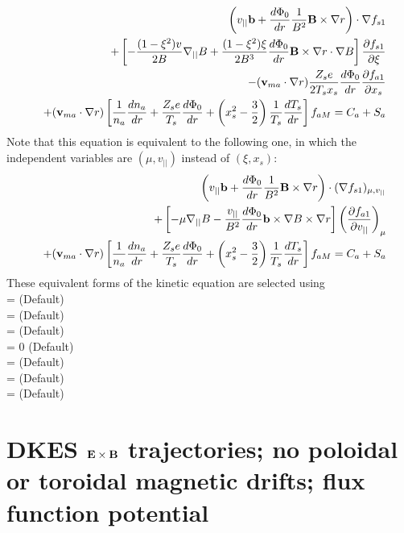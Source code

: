 \begin{eqnarray}
&&\left(v_{||}{\mathbf b} + \frac{d\Phi_0}{dr} \frac{1}{B^2} {\mathbf B}\times\nabla r \right) \cdot \nabla f_{s1} \\
&&+ \left[ - \frac{(1-\xi^2)v}{2B} \nabla_{||} B
+\frac{(1-\xi^2)\xi}{2B^3} \frac{d\Phi_0}{dr}{\mathbf B}\times\nabla r\cdot\nabla B \right]
 \frac{\partial f_{s1}}{\partial \xi} \nonumber \\
&&-({\mathbf v}_{ma} \cdot\nabla r) \frac{Z_s e}{2 T_s x_s} \frac{d\Phi_0}{dr} \frac{\partial f_{a1}}{\partial x_s} \nonumber \\
&&+ ({\mathbf v}_{ma} \cdot \nabla r) \left[ \frac{1}{n_a} \frac{dn_a}{dr} + \frac{Z_s e}{T_s} \frac{d\Phi_0}{dr} + \left(x_s^2-\frac{3}{2}\right) \frac{1}{T_s} \frac{dT_s}{dr}\right] f_{aM}
 = C_a + S_a \nonumber
\end{eqnarray}
Note that this equation is equivalent to the following one, in which the independent variables
are $(\mu,v_{||})$ instead of $(\xi,x_s)$:
\begin{eqnarray}
&&\left(v_{||}{\mathbf b} + \frac{d\Phi_0}{dr} \frac{1}{B^2} {\mathbf B}\times\nabla r \right) \cdot (\nabla f_{s1})_{\mu, v_{||}} \\
&&+ \left[ - \mu \nabla_{||} B
-\frac{v_{||}}{B^2} \frac{d\Phi_0}{dr} {\mathbf b}\times\nabla B \times \nabla r \right]
\left( \frac{\partial f_{a1}}{\partial v_{||}} \right)_{\mu} \nonumber \\
&& + ({\mathbf v}_{ma} \cdot \nabla r) \left[ \frac{1}{n_a} \frac{dn_a}{dr} + \frac{Z_s e}{T_s} \frac{d\Phi_0}{dr} + \left(x_s^2-\frac{3}{2}\right) \frac{1}{T_s} \frac{dT_s}{dr}\right] f_{aM}
=C_a + S_a \nonumber
\end{eqnarray}
These equivalent forms of the kinetic equation are selected using \\
 = \true  \;\;\; (Default) \\
 = \true \;\;\; (Default) \\
 = \false \;\;\; (Default) \\
 = 0 \;\;\; (Default) \\
 = \false \;\;\; (Default) \\
 = \false \;\;\; (Default) \\
 = \false \;\;\; (Default)




\section{DKES ${\mathbf E}\times{\mathbf B}$ trajectories; no poloidal or toroidal magnetic drifts; flux function potential}


